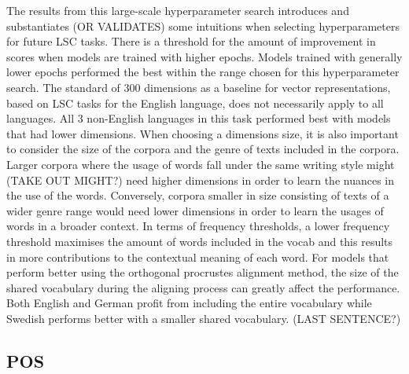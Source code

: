 The results from this large-scale hyperparameter search introduces and substantiates (OR VALIDATES) some intuitions when selecting hyperparameters for future LSC tasks. There is a threshold for the amount of improvement in scores when models are trained with higher epochs. Models trained with generally lower epochs performed the best within the range chosen for this hyperparameter search. The standard of 300 dimensions as a baseline for vector representations, based on LSC tasks for the English language, does not necessarily apply to all languages. All 3 non-English languages in this task performed best with models that had lower dimensions. When choosing a dimensions size, it is also important to consider the size of the corpora and the genre of texts included in the corpora. Larger corpora where the usage of words fall under the same writing style might (TAKE OUT MIGHT?) need higher dimensions in order to learn the nuances in the use of the words. Conversely, corpora smaller in size consisting of texts of a wider genre range would need lower dimensions in order to learn the usages of words in a broader context. In terms of frequency thresholds, a lower frequency threshold maximises the amount of words included in the vocab and this results in more contributions to the contextual meaning of each word. For models that perform better using the orthogonal procrustes alignment method, the size of the shared vocabulary during the aligning process can greatly affect the performance. Both English and German profit from including the entire vocabulary while Swedish performs better with a smaller shared vocabulary. (LAST SENTENCE?)

\subsection{POS}

